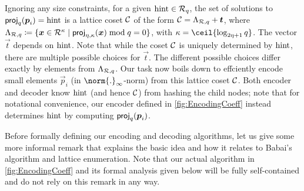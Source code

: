 Ignoring any size constraints, for a given $\mathrm{hint}\in\mathcal{R}_q$, the set of solutions to $\mathsf{proj}_{q}(\boldsymbol{p}_i) = \mathrm{hint}$ is a lattice coset $\mathcal{C}$ of the form $\mathcal{C} = \Lambda_{\mathcal{R},q} + \boldsymbol{t}$, where $\Lambda_{\mathcal{R},q} \coloneqq \{\boldsymbol{x}\in\mathcal{R}^\kappa \mid \mathsf{proj}_{\eta,\kappa}(\boldsymbol{x})\bmod q = 0\}$, with $\limbs = \ceil{\log_{2\eta+1}q}$. The vector $\vec{t}$ depends on $\mathrm{hint}$.
Note that while the coset $\mathcal{C}$ is uniquely determined by $\mathrm{hint}$, there are multiple possible choices for $\vec{t}$. The different possible choices differ exactly by elements from $\Lambda_{\mathcal{R},q}$.
Our task now boils down to effciently encode small elements $\vec{p}_{i}$ (in $\norm{.}_{\infty}$-norm) from this lattice coset $\mathcal{C}$. Both encoder and decoder know $\mathrm{hint}$ (and hence $\mathcal{C}$) from hashing the child nodes; note that for notational convenience, our encoder defined in \autoref{fig:EncodingCoeff} instead determines $\mathrm{hint}$ by computing $\mathsf{proj}_{q}(\boldsymbol{p}_i)$.

\medskip
Before formally defining our encoding and decoding algorithms, let us give some more informal remark that explains the basic idea and how it relates to Babai's algorithm and lattice enumeration. Note that our actual algorithm in \autoref{fig:EncodingCoeff} and its formal analysis given below will be fully self-contained and do not rely on this remark in any way.

